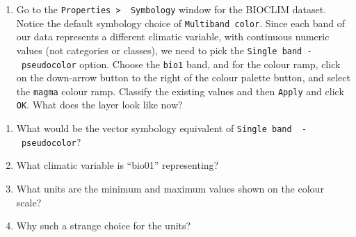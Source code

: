 \documentclass[
  letterpaper,
  DIV=11,
  numbers=noendperiod]{scrreprt}
\providecommand{\tightlist}{%
  \setlength{\itemsep}{0pt}\setlength{\parskip}{0pt}}\usepackage{longtable,booktabs,array}
\begin{document}
\begin{enumerate}
\def\labelenumi{(\arabic{enumi})}
\setcounter{enumi}{143}
\tightlist
\item
  Go to the \texttt{Properties\ \textgreater{}\ \ Symbology} window for
  the BIOCLIM dataset. Notice the default symbology choice of
  \texttt{Multiband\ color}. Since each band of our data represents a
  different climatic variable, with continuous numeric values (not
  categories or classes), we need to pick the
  \texttt{Single\ band\ -\ pseudocolor} option. Choose the \texttt{bio1}
  band, and for the colour ramp, click on the down-arrow button to the
  right of the colour palette button, and select the \texttt{magma}
  colour ramp. Classify the existing values and then \texttt{Apply} and
  click \texttt{OK}. What does the layer look like now?
\end{enumerate}

\begin{tcolorbox}[enhanced jigsaw, breakable, toptitle=1mm, colback=white, left=2mm, leftrule=.75mm, titlerule=0mm, colframe=quarto-callout-important-color-frame, opacityback=0, title=\textcolor{quarto-callout-important-color}{\faExclamation}\hspace{0.5em}{Stop and Think}, toprule=.15mm, opacitybacktitle=0.6, bottomtitle=1mm, colbacktitle=quarto-callout-important-color!10!white, bottomrule=.15mm, coltitle=black, rightrule=.15mm, arc=.35mm]

\begin{enumerate}
\def\labelenumi{\alph{enumi})}
\item
  What would be the vector symbology equivalent of
  \texttt{Single\ band\ \ -\ pseudocolor}?
\item
  What climatic variable is ``bio01'' representing?
\item
  What units are the minimum and maximum values shown on the colour
  scale?
\item
  Why such a strange choice for the units?
\end{enumerate}

\end{tcolorbox}
\end{document}
